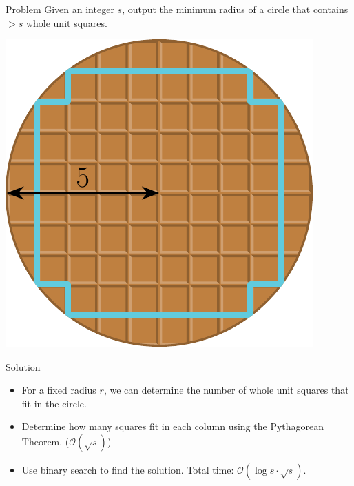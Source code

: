 \begin{frame}
    \frametitle{\problemtitle}
    \begin{block}{Problem}
        Given an integer $s$, output the minimum radius of a circle that contains $> s$ whole unit squares.
    \end{block}

    \pause
    \begin{center}
        \includegraphics[height=0.35\textheight]{sample}
    \end{center}

    \pause
    \begin{block}{Solution}
        \begin{itemize}
            \item<+-> For a fixed radius $r$, we can determine the number of whole unit squares that fit in the circle.
            \item<+-> Determine how many squares fit in each column using
                the Pythagorean Theorem. ($\mathcal O(\sqrt s)$)
            \item<+-> Use binary search to find the solution. Total time:
                $\mathcal O(\log s \cdot \sqrt s)$.
        \end{itemize}
    \end{block}
\end{frame}
